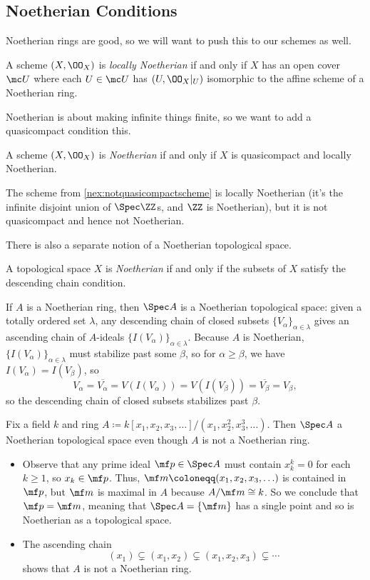 \documentclass[../notes.tex]{subfiles}
\begin{document}
\subsection{Noetherian Conditions}
Noetherian rings are good, so we will want to push this to our schemes as well.
\begin{definition}
	A scheme $(X,\OO_X)$ is \textit{locally Noetherian} if and only if $X$ has an open cover $\mc U$ where each $U\in\mc U$ has $(U,\OO_X|_U)$ isomorphic to the affine scheme of a Noetherian ring.
\end{definition}
Noetherian is about making infinite things finite, so we want to add a quasicompact condition this.
\begin{definition}[Noetherian]
	A scheme $(X,\OO_X)$ is \textit{Noetherian} if and only if $X$ is quasicompact and locally Noetherian.
\end{definition}
\begin{example}
	The scheme from \autoref{nex:notquasicompactscheme} is locally Noetherian (it's the infinite disjoint union of $\Spec\ZZ$s, and $\ZZ$ is Noetherian), but it is not quasicompact and hence not Noetherian.
\end{example}
There is also a separate notion of a Noetherian topological space.
\begin{definition}[Noetherian]
	A topological space $X$ is \textit{Noetherian} if and only if the subsets of $X$ satisfy the descending chain condition.
\end{definition}
\begin{example} \label{ex:noetherianringisnoetherian}
	If $A$ is a Noetherian ring, then $\Spec A$ is a Noetherian topological space: given a totally ordered set $\lambda$, any descending chain of closed subsets $\{V_\alpha\}_{\alpha\in\lambda}$ gives an ascending chain of $A$-ideals $\{I(V_\alpha)\}_{\alpha\in\lambda}$. Because $A$ is Noetherian, $\{I(V_\alpha)\}_{\alpha\in\lambda}$ must stabilize past some $\beta$, so for $\alpha\ge\beta$, we have $I(V_\alpha)=I(V_\beta)$, so
	\[V_\alpha=\overline{V_\alpha}=V(I(V_\alpha))=V(I(V_\beta))=\overline{V_\beta}=V_\beta,\]
	so the descending chain of closed subsets stabilizes past $\beta$.
\end{example}
\begin{nex}
	Fix a field $k$ and ring $A\coloneqq k[x_1,x_2,x_3,\ldots]/\left(x_1,x_2^2,x_3^3,\ldots\right)$. Then $\Spec A$ a Noetherian topological space even though $A$ is not a Noetherian ring.
	\begin{itemize}
		\item Observe that any prime ideal $\mf p\in\Spec A$ must contain $x_k^k=0$ for each $k\ge1$, so $x_k\in\mf p$. Thus, $\mf m\coloneqq(x_1,x_2,x_3,\ldots)$ is contained in $\mf p$, but $\mf m$ is maximal in $A$ because $A/\mf m\cong k$. So we conclude that $\mf p=\mf m$, meaning that $\Spec A=\{\mf m\}$ has a single point and so is Noetherian as a topological space.
		\item The ascending chain
		\[(x_1)\subsetneq(x_1,x_2)\subsetneq(x_1,x_2,x_3)\subsetneq\cdots\]
		shows that $A$ is not a Noetherian ring.
	\end{itemize}
\end{nex}
\end{document}
